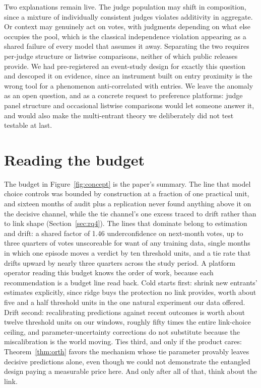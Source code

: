 \documentclass[10pt]{article}
\begin{document}
Two explanations remain live. The judge population may shift in
composition, since a mixture of individually consistent judges
violates additivity in aggregate. Or context may genuinely act on
votes, with judgments depending on what else occupies the pool,
which is the classical independence violation appearing as a shared
failure of every model that assumes it away. Separating the two
requires per-judge structure or listwise comparisons, neither of
which public releases provide. We had pre-registered an event-study
design for exactly this question and descoped it on evidence, since
an instrument built on entry proximity is the wrong tool for a
phenomenon anti-correlated with entries. We leave the anomaly as an
open question, and as a concrete request to preference platforms:
judge panel structure and occasional listwise comparisons would let
someone answer it, and would also make the multi-entrant theory we
deliberately did not test testable at last.

\section{Reading the budget}\label{sec:discussion}

The budget in Figure~\ref{fig:concept} is the paper's summary. The
line that model choice controls was bounded by construction at a
fraction of one practical unit, and sixteen months of audit plus a
replication never found anything above it on the decisive channel,
while the tie channel's one excess traced to drift rather than to
link shape (Section~\ref{sec:rq4}). The lines that dominate
belong to estimation and drift: a shared factor of 1.46
underconfidence on next-month votes, up to three quarters of votes
unscoreable for want of any training data, single months in which
one episode moves a verdict by ten threshold units, and a tie rate
that drifts upward by nearly three quarters across the study
period. A platform operator
reading this budget knows the order of work, because each
recommendation is a budget line read back. Cold starts first: shrink
new entrants' estimates explicitly, since ridge buys the protection no
link provides, worth about five and a half threshold units in the one
natural experiment our data offered. Drift second: recalibrating predictions
against recent outcomes is worth about twelve threshold units on our
windows, roughly fifty times the entire link-choice ceiling, and
parameter-uncertainty corrections do not substitute because the
miscalibration is the world moving. Ties third, and only if the
product cares: Theorem~\ref{thm:orth} favors the mechanism whose tie
parameter provably leaves decisive predictions alone, even though we
could not demonstrate the entangled design paying a measurable price
here. And only after all of that, think about the link.
\end{document}
